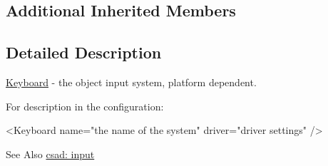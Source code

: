 \subsection*{Additional Inherited Members}


\subsection{Detailed Description}
\hyperlink{classcsad_1_1_keyboard}{Keyboard} -\/ the object input system, platform dependent. 

For description in the configuration\-: \begin{DoxyVerb}  <Keyboard name="the name of the system" driver="driver settings" />
\end{DoxyVerb}


\begin{DoxySeeAlso}{See Also}
\hyperlink{group__input}{csad\-: input} 
\end{DoxySeeAlso}
